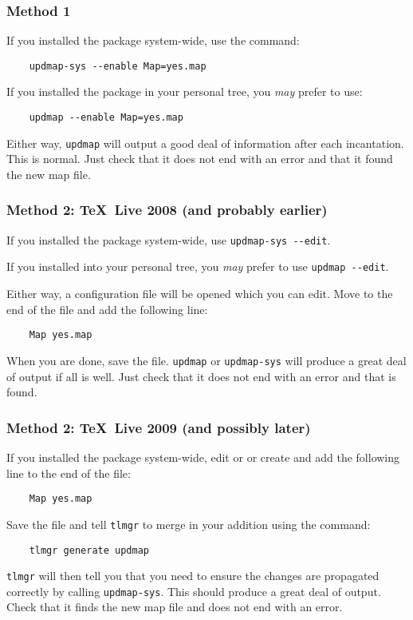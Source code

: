 \documentclass[11pt,british]{article}
\begin{document}
\subsubsection{Method 1}

If you installed the package system-wide, use the command:
\begin{verbatim}
	updmap-sys --enable Map=yes.map
\end{verbatim}
If you installed the package in your personal tree, you \emph{may} prefer to use:
\begin{verbatim}
	updmap --enable Map=yes.map
\end{verbatim}

Either way, \verb|updmap| will output a good deal of information after each incantation. This is normal. Just check that it does not end with an error and that it found the new map file.

\subsubsection{Method 2: \TeX~Live 2008 (and probably earlier)}

If you installed the package system-wide, use \verb|updmap-sys --edit|.

If you installed into your personal tree, you \emph{may} prefer to use	\verb|updmap --edit|.

Either way, a configuration file will be opened which you can edit. Move to the end of the file and add the following line:
\begin{verbatim}
	Map yes.map
\end{verbatim}
When you are done, save the file. \verb|updmap| or \verb|updmap-sys| will produce a great deal of output if all is well. Just check that it does not end with an error and that  is found.

\subsubsection{Method 2: \TeX~Live 2009 (and possibly later)}

If you installed the package system-wide, edit or or create  and add the following line to the end of the file:
\begin{verbatim}
	Map yes.map
\end{verbatim}
Save the file and tell \verb|tlmgr| to merge in your addition using the command:
\begin{verbatim}
	tlmgr generate updmap
\end{verbatim}
\verb|tlmgr| will then tell you that you need to ensure the changes are propagated correctly by calling \verb|updmap-sys|. This should produce a great deal of output. Check that it finds the new map file and does not end with an error.
\end{document}
